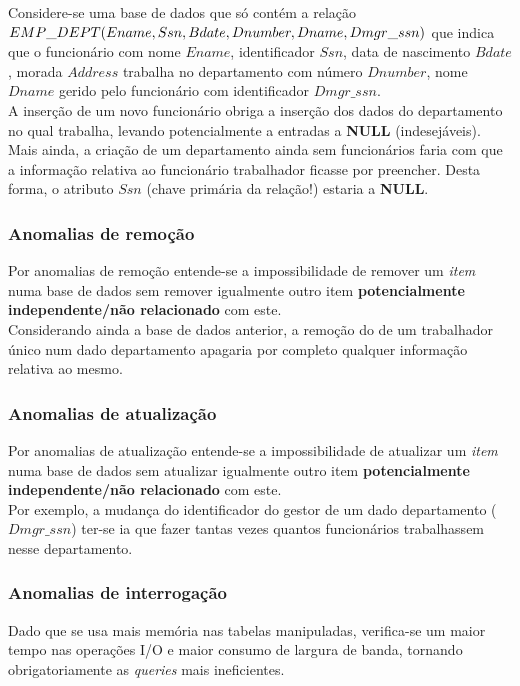\documentclass[oneside]{book}
\theoremstyle{definition}
\begin{document}
Considere-se uma base de dados que só contém a relação $EMP\_DEPT(Ename, Ssn, Bdate, Dnumber, Dname, \\ Dmgr\_ssn)$ que indica que o funcionário com nome $Ename$, identificador $Ssn$, data de nascimento $Bdate$, morada $Address$ trabalha no departamento com número $Dnumber$, nome $Dname$ gerido pelo funcionário com identificador $Dmgr\_ssn$.\\
A inserção de um novo funcionário obriga a inserção dos dados do departamento no qual trabalha, levando potencialmente a entradas a \textbf{NULL} (indesejáveis). Mais ainda, a criação de um departamento ainda sem funcionários faria com que a informação relativa ao funcionário trabalhador ficasse por preencher. Desta forma, o atributo $Ssn$ (chave primária da relação!) estaria a \textbf{NULL}.

\subsubsection*{Anomalias de remoção}

Por anomalias de remoção entende-se a impossibilidade de remover um \textit{item} numa base de dados sem remover igualmente outro item \textbf{potencialmente independente/não relacionado} com este. \\

Considerando ainda a base de dados anterior, a remoção do de um trabalhador único num dado departamento apagaria por completo qualquer informação relativa ao mesmo.

\subsubsection*{Anomalias de atualização}

Por anomalias de atualização entende-se a impossibilidade de atualizar um \textit{item} numa base de dados sem atualizar igualmente outro item \textbf{potencialmente independente/não relacionado} com este. \\
Por exemplo, a mudança do identificador do gestor de um dado departamento ($Dmgr\_ssn$) ter-se ia que fazer tantas vezes quantos funcionários trabalhassem nesse departamento.

\subsubsection*{Anomalias de interrogação}

Dado que se usa mais memória nas tabelas manipuladas, verifica-se um maior tempo nas operações I/O e maior consumo de largura de banda, tornando obrigatoriamente as \textit{queries} mais ineficientes.
\end{document}
